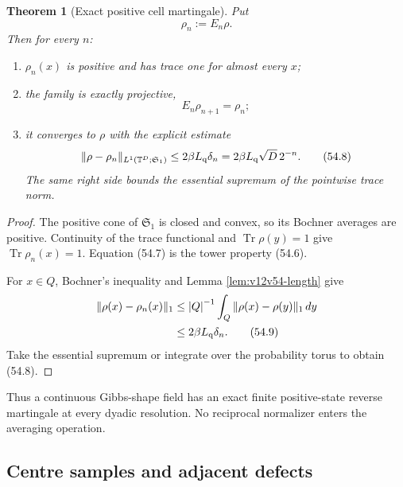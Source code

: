 \documentclass[11pt]{article}
\newtheorem{theorem}{Theorem}[section]
\theoremstyle{remark}
\begin{document}
\begin{theorem}[Exact positive cell martingale]
\label{thm:v12v54-cell-martingale}
Put
\[
                         \rho_n:=E_n\rho.
\]
Then for every \(n\):
\begin{enumerate}
\item \(\rho_n(x)\) is positive and has trace one for almost every
\(x\);
\item the family is exactly projective,
\begin{equation}
                         E_n\rho_{n+1}=\rho_n;     \tag{54.7}
\end{equation}
\item it converges to \(\rho\) with the explicit estimate
\begin{equation}
 \|\rho-\rho_n\|_{L^1({\mathbb T}^D;{\mathfrak S}_1)}
 \leq
 2\beta L_{\rm q}\delta_n
 =
 2\beta L_{\rm q}\sqrt D\,2^{-n}.                 \tag{54.8}
\end{equation}
The same right side bounds the essential supremum of the pointwise
trace norm.
\end{enumerate}
\end{theorem}

\begin{proof}
The positive cone of \({\mathfrak S}_1\) is closed and convex, so its
Bochner averages are positive.  Continuity of the trace functional
and \(\operatorname{Tr}\rho(y)=1\) give
\(\operatorname{Tr}\rho_n(x)=1\).  Equation (54.7) is the tower
property (54.6).

For \(x\in Q\), Bochner's inequality and Lemma
\ref{lem:v12v54-length} give
\begin{align}
 \|\rho(x)-\rho_n(x)\|_1
 &\leq
 {|Q|}^{-1}\int_Q\|\rho(x)-\rho(y)\|_1\,dy
                                                        \nonumber\\
 &\leq
 2\beta L_{\rm q}\delta_n.                       \tag{54.9}
\end{align}
Take the essential supremum or integrate over the probability torus
to obtain (54.8).
\end{proof}

Thus a continuous Gibbs-shape field has an exact finite
positive-state reverse martingale at every dyadic resolution.  No
reciprocal normalizer enters the averaging operation.

\subsection{Centre samples and adjacent defects}
\end{document}
